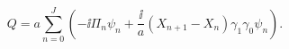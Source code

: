 \begin{equation}\label{discr-su}
  Q=a\sum_{n=0}^J\left(-\ii
  \Pi_n\psi_n+\frac{\ii}{a}(X_{n+1}-X_n)\gamma_1\gamma_0\psi_n\right).
\end{equation}

